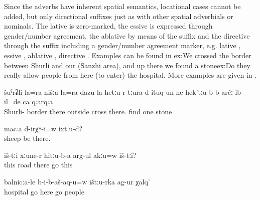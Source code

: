 Since the adverbs have inherent spatial semantics, locational cases cannot be added, but only directional suffixes just as with other spatial adverbials or nominals. The lative is zero-marked, the essive is expressed through gender/number agreement, the ablative by means of the suffix  and the directive through the suffix  including a gender/number agreement marker, e.g. lative , essive , ablative , directive . Examples can be found in {ex:We crossed the border between Shurli and our (Sanzhi area), and up there we found a stone}{ex:Do they really allow people from here (to enter) the hospital}. More examples are given in .
%
\begin{exe}
	\ex	\label{ex:We crossed the border between Shurli and our (Sanzhi area), and up there we found a stone}
	\gll	šuˁrʡli-la=ra	nišːa-la=ra	dazu-la	hetːu-r	tːura	d-ituq-un-ne	hek'tːu-b	b-arčː-ib-il=de	ca	qːarqːa\\
		Shurli-		border	there	outside	cross	there.	find	one	stone\\
	\glt	{}

	\ex	\label{ex:Were there sheep up there}
	\gll	macːa	d-irχʷ-i=w	ixtːu-d?\\
		sheep	be	there.\\
	\glt	{}

	\ex	\label{ex:They are walking on (along) the road there, right, these}
	\gll	iš-tːi	xːune-r	hitːu-b-a	arg-ul akːu=w	iš-tːi?\\
		this	road	there	go 	this\\
	\glt	{}

	\ex	\label{ex:Do they really allow people from here (to enter) the hospital}
	\gll	balnicːa-le	b-i-b-aš-aq-u=w	ištːu-rka	ag-ur	χalq'\\
		hospital	go	here	go	people\\
	\glt	{}
\end{exe}

